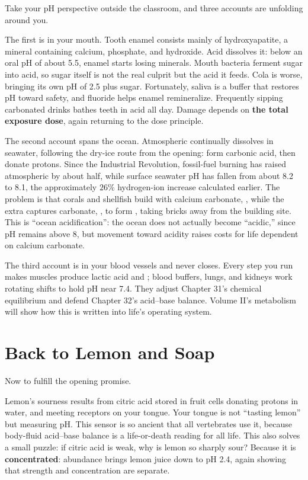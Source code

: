 Take your pH perspective outside the classroom, and three accounts are unfolding around you.

The first is in your mouth. Tooth enamel consists mainly of hydroxyapatite, a mineral containing calcium, phosphate, and hydroxide. Acid dissolves it: below an oral pH of about 5.5, enamel starts losing minerals. Mouth bacteria ferment sugar into acid, so sugar itself is not the real culprit but the acid it feeds. Cola is worse, bringing its own pH of 2.5 plus sugar. Fortunately, saliva is a buffer that restores pH toward safety, and fluoride helps enamel remineralize. Frequently sipping carbonated drinks bathes teeth in acid all day. Damage depends on \textbf{the total exposure dose}, again returning to the dose principle.

The second account spans the ocean. Atmospheric  continually dissolves in seawater, following the dry-ice route from the opening: form carbonic acid, then donate protons. Since the Industrial Revolution, fossil-fuel burning has raised atmospheric  by about half, while surface seawater pH has fallen from about 8.2 to 8.1, the approximately $26\%$ hydrogen-ion increase calculated earlier. The problem is that corals and shellfish build with calcium carbonate, , while the extra  captures carbonate, , to form , taking bricks away from the building site. This is ``ocean acidification'': the ocean does not actually become ``acidic,'' since pH remains above 8, but movement toward acidity raises costs for life dependent on calcium carbonate.

The third account is in your blood vessels and never closes. Every step you run makes muscles produce lactic acid and ; blood buffers, lungs, and kidneys work rotating shifts to hold pH near 7.4. They adjust Chapter 31's chemical equilibrium and defend Chapter 32's acid--base balance. Volume II's metabolism will show how this is written into life's operating system.

\section{Back to Lemon and Soap}

Now to fulfill the opening promise.

Lemon's sourness results from citric acid stored in fruit cells donating protons in water, and  meeting receptors on your tongue. Your tongue is not ``tasting lemon'' but measuring pH. This sensor is so ancient that all vertebrates use it, because body-fluid acid--base balance is a life-or-death reading for all life. This also solves a small puzzle: if citric acid is weak, why is lemon so sharply sour? Because it is \textbf{concentrated}: abundance brings lemon juice down to pH 2.4, again showing that strength and concentration are separate.

